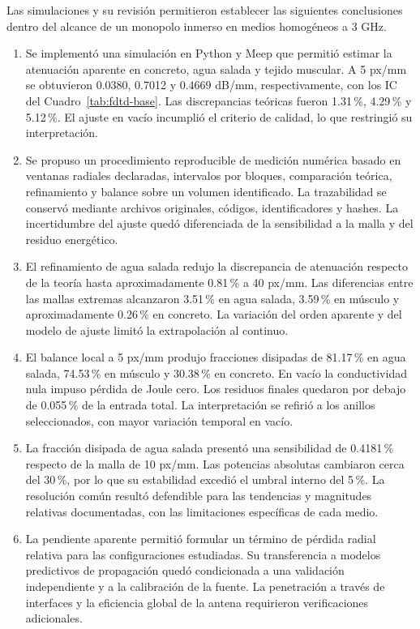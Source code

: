 Las simulaciones y su revisión permitieron establecer las siguientes conclusiones dentro del alcance de un monopolo inmerso en medios homogéneos a 3 GHz.
\begin{enumerate}
\item Se implementó una simulación en Python y Meep que permitió estimar la atenuación aparente en concreto, agua salada y tejido muscular. A 5 px/mm se obtuvieron 0.0380, 0.7012 y 0.4669 dB/mm, respectivamente, con los IC del Cuadro~\ref{tab:fdtd-base}. Las discrepancias teóricas fueron 1.31\,\%, 4.29\,\% y 5.12\,\%. El ajuste en vacío incumplió el criterio de calidad, lo que restringió su interpretación.
\item Se propuso un procedimiento reproducible de medición numérica basado en ventanas radiales declaradas, intervalos por bloques, comparación teórica, refinamiento y balance sobre un volumen identificado. La trazabilidad se conservó mediante archivos originales, códigos, identificadores y hashes. La incertidumbre del ajuste quedó diferenciada de la sensibilidad a la malla y del residuo energético.
\item El refinamiento de agua salada redujo la discrepancia de atenuación respecto de la teoría hasta aproximadamente 0.81\,\% a 40 px/mm. Las diferencias entre las mallas extremas alcanzaron 3.51\,\% en agua salada, 3.59\,\% en músculo y aproximadamente 0.26\,\% en concreto. La variación del orden aparente y del modelo de ajuste limitó la extrapolación al continuo.
\item El balance local a 5 px/mm produjo fracciones disipadas de 81.17\,\% en agua salada, 74.53\,\% en músculo y 30.38\,\% en concreto. En vacío la conductividad nula impuso pérdida de Joule cero. Los residuos finales quedaron por debajo de 0.055\,\% de la entrada total. La interpretación se refirió a los anillos seleccionados, con mayor variación temporal en vacío.
\item La fracción disipada de agua salada presentó una sensibilidad de 0.4181\,\% respecto de la malla de 10 px/mm. Las potencias absolutas cambiaron cerca del 30\,\%, por lo que su estabilidad excedió el umbral interno del 5\,\%. La resolución común resultó defendible para las tendencias y magnitudes relativas documentadas, con las limitaciones específicas de cada medio.
\item La pendiente aparente permitió formular un término de pérdida radial relativa para las configuraciones estudiadas. Su transferencia a modelos predictivos de propagación quedó condicionada a una validación independiente y a la calibración de la fuente. La penetración a través de interfaces y la eficiencia global de la antena requirieron verificaciones adicionales.
\end{enumerate}
